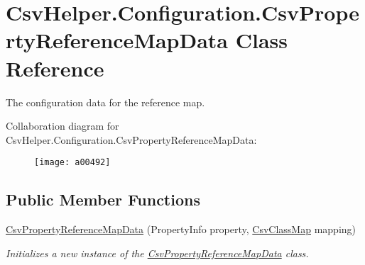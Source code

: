 \hypertarget{a00070}{\section{Csv\-Helper.\-Configuration.\-Csv\-Property\-Reference\-Map\-Data Class Reference}
\label{a00070}
}


The configuration data for the reference map.  




Collaboration diagram for Csv\-Helper.\-Configuration.\-Csv\-Property\-Reference\-Map\-Data\-:
\nopagebreak
\begin{figure}[H]
\begin{center}
\leavevmode
\texttt{[image: a00492]}
\end{center}
\end{figure}
\subsection*{Public Member Functions}
\begin{DoxyCompactItemize}
\item 
\hyperlink{a00070_ad6fe2913932a9fe434f8a908dec30e8b}{Csv\-Property\-Reference\-Map\-Data} (Property\-Info property, \hyperlink{a00054}{Csv\-Class\-Map} mapping)
\begin{DoxyCompactList}\small\item\em Initializes a new instance of the \hyperlink{a00070}{Csv\-Property\-Reference\-Map\-Data} class. \end{DoxyCompactList}\end{DoxyCompactItemize}
